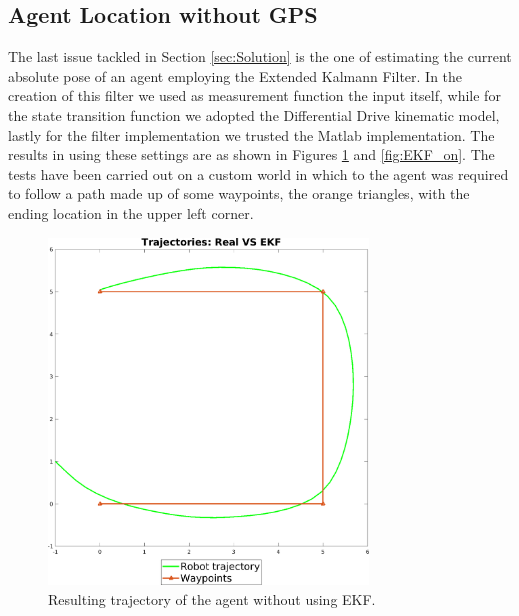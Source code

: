 \documentclass[twocolumn, a4paper]{article}
\begin{document}
\subsection{Agent Location without GPS}
The last issue tackled in Section \ref{sec:Solution} is the one of estimating
the current absolute pose of an agent employing the Extended Kalmann Filter.
In the creation of this filter we used as measurement function the input
itself, while for the state transition function we adopted the Differential
Drive kinematic model, lastly for the filter implementation we trusted the
Matlab implementation. The results in using these settings are as shown
in Figures \ref{fig:EKF_off} and \ref{fig:EKF_on}.
The tests have been carried out on a custom world in which to the agent was
required to follow a path made up of some waypoints, the orange triangles, with
the ending location in the upper left corner.
\vspace{0.5cm}
\begin{figure}[h!]
    \centering
    \includegraphics[width=8.5cm]{"../Report_images/Trajectory_no_EKF.png"}
    \caption{Resulting trajectory of the agent without using EKF.}
    \label{fig:EKF_off}
\end{figure}
\newpage
\end{document}
